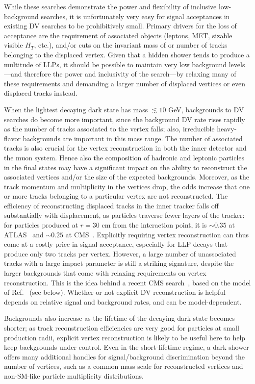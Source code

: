 \begin{enumerate}
While these searches demonstrate the power and flexibility of inclusive low-background searches, it is unfortunately very easy for signal acceptances in  existing DV searches to be prohibitively small.  Primary drivers for the loss of acceptance are the requirement of associated objects (leptons, MET, sizable visible $H_T$, etc.), and/or cuts on the invariant mass of or number of tracks belonging to the displaced vertex. Given that a hidden shower tends to produce a multitude of LLPs, it should be possible to maintain very low background levels---and therefore the power and inclusivity of the search---by relaxing many of these requirements and demanding a larger number of displaced vertices or even displaced tracks instead.

When the lightest decaying dark state has mass $\lesssim 10$ GeV, backgrounds to DV searches do become more important,  since the background DV rate rises rapidly as the number of tracks associated to the vertex falls; also, irreducible heavy-flavor backgrounds are important in this mass range. The number of associated tracks is also crucial for the vertex reconstruction in both the inner detector and the muon system. Hence also the composition of hadronic and leptonic particles in the final states may have a significant impact on the ability to reconstruct the associated vertices and/or the size of the expected backgrounds. Moreover, as the track momentum and multiplicity in the vertices drop, the odds increase that one or more tracks belonging to a particular vertex are not reconstructed.
The efficiency of reconstructing displaced tracks in the inner tracker falls off substantially with displacement, as particles traverse fewer layers of the tracker: for particles produced at $r=30$ cm  from the interaction point, it is $\sim 0.35$ at ATLAS~\cite{ATL-PHYS-PUB-2017-014} and $\sim 0.25$ at CMS~\cite{Rovere:2134627}.  Explicitly requiring vertex reconstruction can thus come at a costly price in signal acceptance, especially for LLP decays that produce only two tracks per vertex. However, a large number of unassociated tracks with a large impact parameter is still a striking signature, despite the larger backgrounds that come with relaxing requirements on vertex reconstruction.   This is the idea behind a recent CMS search~\cite{Sirunyan:2018njd}, based on the model of Ref.~\cite{Schwaller:2015gea} (see below).  Whether or not explicit DV reconstruction is helpful depends on relative signal and background rates, and can be model-dependent.

Backgrounds also increase as the lifetime of the decaying dark state becomes shorter; as track reconstruction efficiencies are very good for particles at small production radii, explicit vertex reconstruction is likely to be useful here to help keep backgrounds under control.  Even in the short-lifetime regime, a dark shower offers many additional handles for signal/background discrimination beyond the number of vertices, such as a common mass scale for reconstructed vertices and non-SM-like particle multiplicity distributions.



\end{enumerate}
